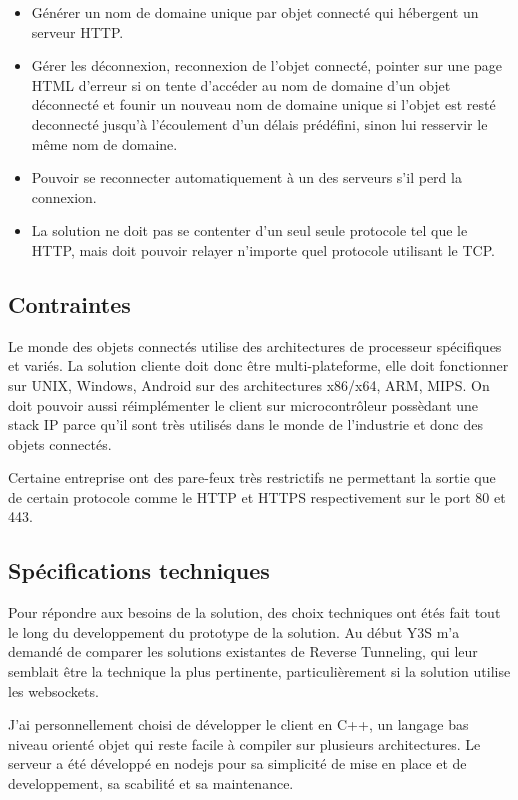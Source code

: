 \begin{itemize}
    \item Générer un nom de domaine unique par objet connecté qui hébergent un serveur HTTP.
    \item Gérer les déconnexion, reconnexion de l'objet connecté, pointer sur une page HTML d'erreur si on tente d'accéder au nom de domaine d'un objet déconnecté et founir un nouveau nom de domaine unique si l'objet est resté deconnecté jusqu'à l'écoulement d'un délais prédéfini, sinon lui resservir le même nom de domaine.
    \item Pouvoir se reconnecter automatiquement à un des serveurs s'il perd la connexion.
    \item La solution ne doit pas se contenter d'un seul seule protocole tel que le HTTP, mais doit pouvoir relayer n'importe quel protocole utilisant le TCP.
\end{itemize}

\subsection{Contraintes}

Le monde des objets connectés utilise des architectures de processeur spécifiques et variés. La solution cliente doit donc être multi-plateforme, elle doit fonctionner sur UNIX, Windows, Android sur des architectures x86/x64, ARM, MIPS. On doit pouvoir aussi réimplémenter le client sur microcontrôleur possèdant une stack IP parce qu'il sont très utilisés dans le monde de l'industrie et donc des objets connectés.

Certaine entreprise ont des pare-feux très restrictifs ne permettant la sortie que de certain protocole comme le HTTP et HTTPS respectivement sur le port 80 et 443.

\subsection{Spécifications techniques}

Pour répondre aux besoins de la solution, des choix techniques ont étés fait tout le long du developpement du prototype de la solution. Au début Y3S m'a demandé de comparer les solutions existantes de Reverse Tunneling, qui leur semblait être la technique la plus pertinente, particulièrement si la solution utilise les websockets.

J'ai personnellement choisi de développer le client en C++, un langage bas niveau orienté objet qui reste facile à compiler sur plusieurs architectures. Le serveur a été développé en nodejs pour sa simplicité de mise en place et de developpement, sa scabilité et sa maintenance.

